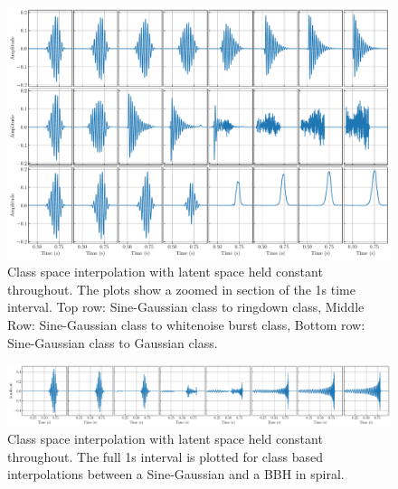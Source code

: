 \documentclass[12pt]{iopart}
\begin{document}
\begin{figure}
    \centering
    \includegraphics[width=\textwidth]{figures/4_c_interp.pdf}
    \caption{Class space interpolation with latent space held constant throughout. The plots show a zoomed in section of the 1s time interval. Top row: Sine-Gaussian class to ringdown class, Middle Row: Sine-Gaussian class to whitenoise burst class, Bottom row: Sine-Gaussian class to Gaussian class.}
    \label{fig:c_interp}
\end{figure}

\begin{figure}
    \centering
    \includegraphics[width=\textwidth]{figures/sg_bbh_interp.pdf}
    \caption{Class space interpolation with latent space held constant throughout. The full 1s interval is plotted for class based interpolations between a Sine-Gaussian and a BBH in spiral.}
    \label{fig:sgbbh_interp}
\end{figure}
\end{document}
